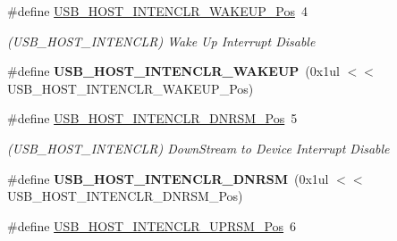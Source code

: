 \begin{DoxyCompactItemize}
\item 
\hypertarget{group___s_a_m_l21___u_s_b_ga79300961ec1ec94d4761d702bf40b21f}{}\#define \hyperlink{group___s_a_m_l21___u_s_b_ga79300961ec1ec94d4761d702bf40b21f}{U\+S\+B\+\_\+\+H\+O\+S\+T\+\_\+\+I\+N\+T\+E\+N\+C\+L\+R\+\_\+\+W\+A\+K\+E\+U\+P\+\_\+\+Pos}~4\label{group___s_a_m_l21___u_s_b_ga79300961ec1ec94d4761d702bf40b21f}

\begin{DoxyCompactList}\small\item\em (U\+S\+B\+\_\+\+H\+O\+S\+T\+\_\+\+I\+N\+T\+E\+N\+C\+L\+R) Wake Up Interrupt Disable \end{DoxyCompactList}\item 
\hypertarget{group___s_a_m_l21___u_s_b_ga93cf0faa802eb5ce37b3438544e94900}{}\#define {\bfseries U\+S\+B\+\_\+\+H\+O\+S\+T\+\_\+\+I\+N\+T\+E\+N\+C\+L\+R\+\_\+\+W\+A\+K\+E\+U\+P}~(0x1ul $<$$<$ U\+S\+B\+\_\+\+H\+O\+S\+T\+\_\+\+I\+N\+T\+E\+N\+C\+L\+R\+\_\+\+W\+A\+K\+E\+U\+P\+\_\+\+Pos)\label{group___s_a_m_l21___u_s_b_ga93cf0faa802eb5ce37b3438544e94900}

\item 
\hypertarget{group___s_a_m_l21___u_s_b_gaff35d18b263ecec920220f990a1bdba3}{}\#define \hyperlink{group___s_a_m_l21___u_s_b_gaff35d18b263ecec920220f990a1bdba3}{U\+S\+B\+\_\+\+H\+O\+S\+T\+\_\+\+I\+N\+T\+E\+N\+C\+L\+R\+\_\+\+D\+N\+R\+S\+M\+\_\+\+Pos}~5\label{group___s_a_m_l21___u_s_b_gaff35d18b263ecec920220f990a1bdba3}

\begin{DoxyCompactList}\small\item\em (U\+S\+B\+\_\+\+H\+O\+S\+T\+\_\+\+I\+N\+T\+E\+N\+C\+L\+R) Down\+Stream to Device Interrupt Disable \end{DoxyCompactList}\item 
\hypertarget{group___s_a_m_l21___u_s_b_gaa66f348f070adac5c8e55046ed9794cb}{}\#define {\bfseries U\+S\+B\+\_\+\+H\+O\+S\+T\+\_\+\+I\+N\+T\+E\+N\+C\+L\+R\+\_\+\+D\+N\+R\+S\+M}~(0x1ul $<$$<$ U\+S\+B\+\_\+\+H\+O\+S\+T\+\_\+\+I\+N\+T\+E\+N\+C\+L\+R\+\_\+\+D\+N\+R\+S\+M\+\_\+\+Pos)\label{group___s_a_m_l21___u_s_b_gaa66f348f070adac5c8e55046ed9794cb}

\item 
\hypertarget{group___s_a_m_l21___u_s_b_ga17896ebf36d580baaea2f47f877c301c}{}\#define \hyperlink{group___s_a_m_l21___u_s_b_ga17896ebf36d580baaea2f47f877c301c}{U\+S\+B\+\_\+\+H\+O\+S\+T\+\_\+\+I\+N\+T\+E\+N\+C\+L\+R\+\_\+\+U\+P\+R\+S\+M\+\_\+\+Pos}~6\label{group___s_a_m_l21___u_s_b_ga17896ebf36d580baaea2f47f877c301c}


\end{DoxyCompactItemize}
